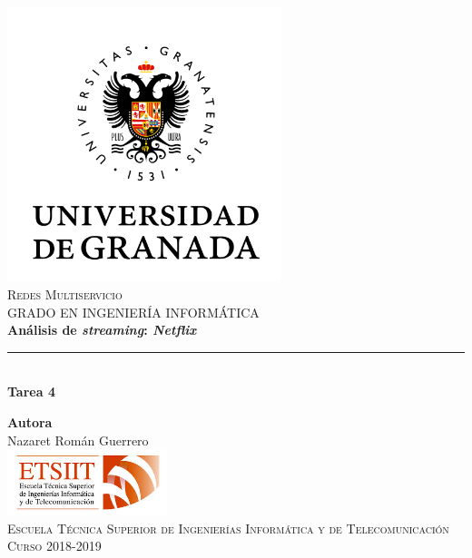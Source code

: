 \documentclass[11pt,a4paper]{article}
\begin{document}
\begin{titlepage}

\begin{minipage}{\textwidth}

\centering
\includegraphics[width=0.6\textwidth]{img/logo.png}\\

\textsc{\Large Redes Multiservicio\\[0.2cm]}
\textsc{GRADO EN INGENIERÍA INFORMÁTICA}\\[1cm]

{\Huge\bfseries Análisis de \textit{streaming}: \textit{Netflix}\\}
\noindent\rule[-1ex]{\textwidth}{3pt}\\[3.5ex]
{\large\bfseries Tarea 4}
\end{minipage}

\vspace{1cm}
\begin{minipage}{\textwidth}
\centering

\textbf{Autora}\\ {Nazaret Román Guerrero}\\[2.5ex]
\includegraphics[width=0.35\textwidth]{img/etsiit.jpeg}\\[0.1cm]
\vspace{0.5cm}
\textsc{Escuela Técnica Superior de Ingenierías Informática y de Telecomunicación}\\
\vspace{0.5cm}
\textsc{Curso 2018-2019}
\end{minipage}
\end{titlepage}
\end{document}
